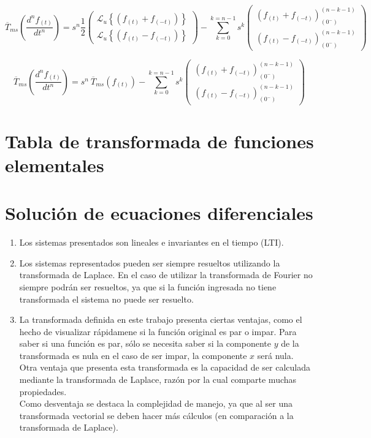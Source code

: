 \documentclass[12pt]{article}
\begin{document}
$$\overline{T}_{ms}\left(\frac{d^n f_{(t)}}{dt^n}\right) =s^n \frac12
\begin{pmatrix}
\mathcal{L}_u\left\{(f_{(t)} + f_{(-t)})\right\} \\[0.5 cm]
\mathcal{L}_u\left\{(f_{(t)} - f_{(-t)})\right\} 
\end{pmatrix}
- \sum\limits_{k=0}^{k=n-1} s^k
\begin{pmatrix}
 (f_{(t)} + f_{(-t)})^{(n-k-1)}_{(0^-)}\\[0.5 cm]
 (f_{(t)} - f_{(-t)})^{(n-k-1)}_{(0^-)}
\end{pmatrix}
$$

$$\overline{T}_{ms}\left(\frac{d^n f_{(t)}}{dt^n}\right) =s^n\  \overline{T}_{ms}(f_{(t)})
- \sum\limits_{k=0}^{k=n-1} s^k
\begin{pmatrix}
 (f_{(t)} + f_{(-t)})^{(n-k-1)}_{(0^-)}\\[0.5 cm]
 (f_{(t)} - f_{(-t)})^{(n-k-1)}_{(0^-)}
\end{pmatrix}
$$

\section{Tabla de transformada de funciones elementales}


\section{Solución de ecuaciones diferenciales}
\begin{enumerate}[label=(\alph*)]
\item Los sistemas presentados son lineales e invariantes en el tiempo (LTI).
\item Los sistemas representados pueden ser siempre resueltos utilizando la transformada de Laplace. En el caso de utilizar la transformada de Fourier no siempre podrán ser resueltos, ya que si la función ingresada no tiene transformada el sistema no puede ser resuelto.
\item La transformada definida en este trabajo presenta ciertas ventajas, como el  hecho de visualizar rápidamene si la función original es par o impar. Para saber si una función es par, sólo se necesita saber si la componente $y$ de la transformada es nula en el caso de ser impar, la componente $x$ será nula. Otra ventaja que presenta esta transformada es la capacidad de ser calculada mediante la transformada de Laplace, razón por la cual comparte muchas propiedades.\\

Como desventaja se destaca la complejidad de manejo, ya que al ser una transformada vectorial se deben hacer más cálculos  (en comparación a la transformada de Laplace).
\end{enumerate}
\end{document}
